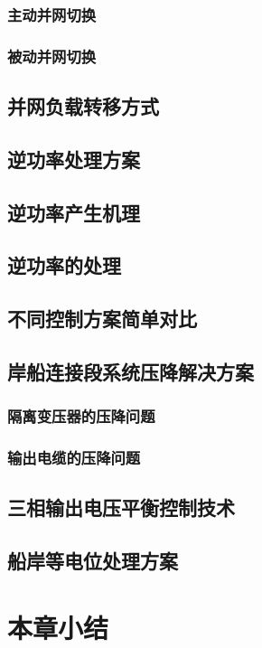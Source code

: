 \subsubsection{主动并网切换}
\subsubsection{被动并网切换}

\subsection{并网负载转移方式}
\subsection{逆功率处理方案}
\subsection{逆功率产生机理}
\subsection{逆功率的处理}
\subsection{不同控制方案简单对比}




\subsection{岸船连接段系统压降解决方案}

\subsubsection{隔离变压器的压降问题}
\subsubsection{输出电缆的压降问题}


\subsection{三相输出电压平衡控制技术}
\subsection{船岸等电位处理方案}


\zhlipsum[5]

\section{本章小结}


\zhlipsum[6]